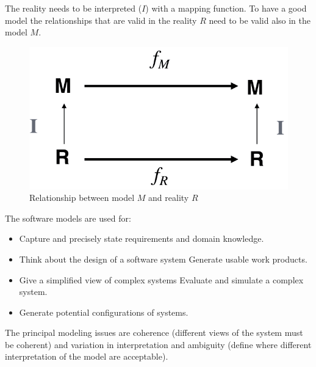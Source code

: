 \documentclass[12pt, a4paper]{report}
\begin{document}
    The reality needs to be interpreted ($I$) with a mapping function. To have a good model the relationships that are valid in the reality $R$ need to be valid also in the 
    model $M$.
    \begin{figure}[H]
        \centering
        \includegraphics[width=0.5\linewidth]{images/modeling.png}
        \caption{Relationship between model $M$ and reality $R$}
    \end{figure}
    The software models are used for: 
    \begin{itemize}
        \item Capture and precisely state requirements and domain knowledge.
        \item Think about the design of a software system Generate usable work products.
        \item Give a simplified view of complex systems Evaluate and simulate a complex system.
        \item Generate potential configurations of systems.
    \end{itemize}
    The principal modeling issues are coherence (different views of the system must be coherent) and variation in interpretation and ambiguity (define where different 
    interpretation of the model are acceptable).
     
\end{document}
